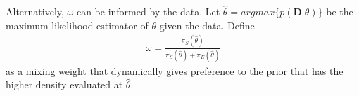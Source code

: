 \documentclass[12pt]{article}
\begin{document}
Alternatively, $\omega$ can be informed by the data. Let $\hat{\theta}=argmax \{p(\mathbf{D}|\theta)\}$ be the maximum likelihood estimator of $\theta$ given the data. Define
\begin{align}
\omega=\frac{\pi_S(\hat{\theta})}{\pi_S(\hat{\theta})+\pi_E(\hat{\theta})}
\end{align}
as a mixing weight that dynamically gives preference to the prior that has the higher density evaluated at $\hat{\theta}$.

\end{document}
